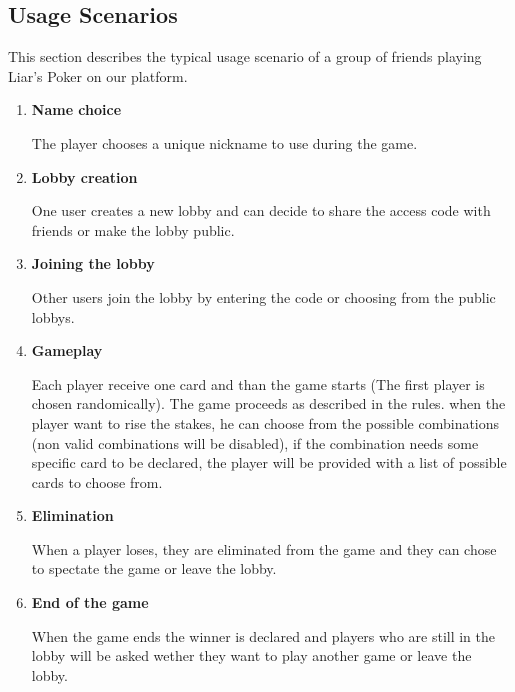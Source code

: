 \documentclass{scrartcl}
\begin{document}
\subsection{Usage Scenarios}\label{usage-scenarios}
This section describes the typical usage scenario of a group of friends playing Liar's Poker on our platform.
\begin{enumerate}
  \item \textbf{Name choice}\par
  The player chooses a unique nickname to use during the game.
  \item \textbf{Lobby creation}\par
  One user creates a new lobby and can decide to share the access code with friends or make the lobby public. 
  \item \textbf{Joining the lobby}\par
  Other users join the lobby by entering the code or choosing from the public lobbys.
  \item \textbf{Gameplay}\par
  Each player receive one card and than the game starts (The first player is chosen randomically). The game proceeds as described in the rules. when the player want to rise the stakes, he can choose from the possible combinations (non valid combinations will be disabled), if the combination needs some specific card to be declared, the player will be provided with a list of possible cards to choose from.
  \item \textbf{Elimination}\par
  When a player loses, they are eliminated from the game and they can chose to spectate the game or leave the lobby.
  \item \textbf{End of the game}\par
  When the game ends the winner is declared and players who are still in the lobby will be asked wether they want to play another game or leave the lobby.
\end{enumerate}
\end{document}
